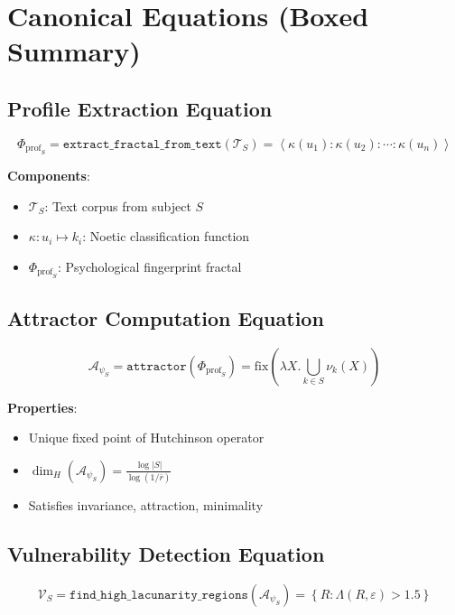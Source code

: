 \documentclass[11pt,twoside]{book}
\newcommand{\noe}[1]{\nu_{#1}}
\newcommand{\HausdorffDim}{\dim_H}
\newcommand{\fix}{\mathrm{fix}}
\newcommand{\Lacunarity}{\Lambda}
\newcommand{\PsychAttractor}{\mathcal{A}_\psi}
\newcommand{\ProfileFrac}{\Phi_{\mathrm{prof}}}
\newcommand{\VulnSet}{\mathcal{V}}
\newcommand{\TextCorpus}{\mathcal{T}}
\begin{document}
\section{Canonical Equations (Boxed Summary)}

\subsection{Profile Extraction Equation}

\begin{equation}
\boxed{
    \ProfileFrac_S = \texttt{extract\_fractal\_from\_text}(\TextCorpus_S) =
    \left\langle \kappa(u_1) : \kappa(u_2) : \cdots : \kappa(u_n) \right\rangle
}
\end{equation}

\textbf{Components}:
\begin{itemize}
    \item $\TextCorpus_S$: Text corpus from subject $S$
    \item $\kappa : u_i \mapsto k_i$: Noetic classification function
    \item $\ProfileFrac_S$: Psychological fingerprint fractal
\end{itemize}

\subsection{Attractor Computation Equation}

\begin{equation}
\boxed{
    \PsychAttractor_S = \texttt{attractor}(\ProfileFrac_S) =
    \fix\left(\lambda X. \bigcup_{k \in S} \noe{k}(X)\right)
}
\end{equation}

\textbf{Properties}:
\begin{itemize}
    \item Unique fixed point of Hutchinson operator
    \item $\HausdorffDim(\PsychAttractor_S) = \frac{\log|S|}{\log(1/\bar{r})}$
    \item Satisfies invariance, attraction, minimality
\end{itemize}

\subsection{Vulnerability Detection Equation}

\begin{equation}
\boxed{
    \VulnSet_S = \texttt{find\_high\_lacunarity\_regions}(\PsychAttractor_S) =
    \left\{ R : \Lacunarity(R, \varepsilon) > 1.5 \right\}
}
\end{equation}
\end{document}
